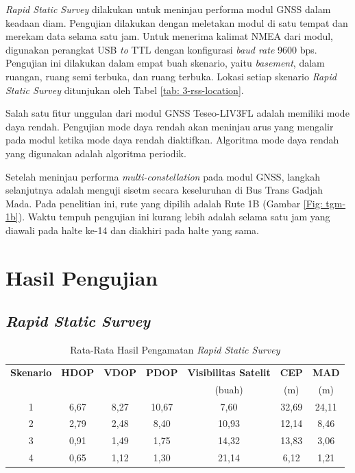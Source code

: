 \documentclass[conference]{IEEEtran}
\begin{document}
\textit{Rapid Static Survey} dilakukan untuk meninjau performa modul GNSS dalam keadaan diam. Pengujian dilakukan dengan meletakan modul di satu tempat dan merekam data selama satu jam. Untuk menerima kalimat NMEA dari modul, digunakan perangkat USB \textit{to} TTL dengan konfigurasi \textit{baud rate} 9600 bps. Pengujian ini dilakukan dalam empat buah skenario, yaitu \textit{basement}, dalam ruangan, ruang semi terbuka, dan ruang terbuka. Lokasi setiap skenario \textit{Rapid Static Survey} ditunjukan oleh Tabel \ref{tab: 3-rss-location}.

Salah satu fitur unggulan dari modul GNSS Teseo-LIV3FL adalah memiliki mode daya rendah. Pengujian mode daya rendah akan meninjau arus yang mengalir pada modul ketika mode daya rendah diaktifkan. Algoritma mode daya rendah yang digunakan adalah algoritma periodik.

Setelah meninjau performa \textit{multi-constellation} pada modul GNSS, langkah selanjutnya adalah menguji sisetm secara keseluruhan di Bus Trans Gadjah Mada. Pada penelitian ini, rute yang dipilih adalah Rute 1B (Gambar \ref{Fig: tgm-1b}). Waktu tempuh pengujian ini kurang lebih adalah selama satu jam yang diawali pada halte ke-14 dan diakhiri pada halte yang sama.

\section{Hasil Pengujian}
\subsection{\textit{Rapid Static Survey}}
\begin{table}[tbp]
	\centering
	\renewcommand{\arraystretch}{1.5}
	\caption{Rata-Rata Hasil Pengamatan \textit{Rapid Static Survey}}
	\label{tab: 4-rss-summary}
	\begin{tabular}{ccccccc}
		\hline
		\textbf{Skenario} & \textbf{HDOP} & \textbf{VDOP} & \textbf{PDOP} & \textbf{Visibilitas Satelit} & \textbf{CEP} & \textbf{MAD} \\
		&  & &  & (buah) & (m) & (m) \\
		\hline
		1 & 6,67 & 8,27 & 10,67 & 7,60 & 32,69 & 24,11 \\
		2 & 2,79 & 2,48 & 8,40 & 10,93 & 12,14 & 8,46 \\
		3 & 0,91 & 1,49 & 1,75 & 14,32 & 13,83 & 3,06 \\
		4 & 0,65 & 1,12 & 1,30 & 21,14 & 6,12 & 1,21 \\
		\hline
	\end{tabular}
\end{table}
\end{document}
